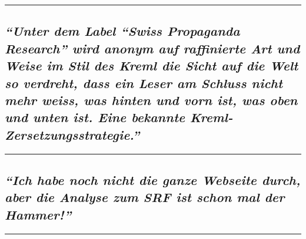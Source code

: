 \begin{center}\rule{0.5\linewidth}{\linethickness}\end{center}

\hypertarget{unter-dem-label-swiss-propaganda-research-wird-anonym-auf-raffinierte-art-und-weise-im-stil-des-kreml-die-sicht-auf-die-welt-so-verdreht-dass-ein-leser-am-schluss-nicht-mehr-weiss-was-hinten-und-vorn-ist-was-oben-und-unten-ist-eine-bekannte-kreml-zersetzungsstrategie}{%
\subsection{\texorpdfstring{\emph{``Unter dem Label ``Swiss Propaganda
Research'' wird anonym auf raffinierte Art und Weise im Stil des Kreml
die Sicht auf die Welt so verdreht, dass ein Leser am Schluss nicht mehr
weiss, was hinten und vorn ist, was oben und unten ist. Eine bekannte
Kreml-Zersetzungs­strategie.''}}{``Unter dem Label ``Swiss Propaganda Research'' wird anonym auf raffinierte Art und Weise im Stil des Kreml die Sicht auf die Welt so verdreht, dass ein Leser am Schluss nicht mehr weiss, was hinten und vorn ist, was oben und unten ist. Eine bekannte Kreml-Zersetzungs­strategie.''}}\label{unter-dem-label-swiss-propaganda-research-wird-anonym-auf-raffinierte-art-und-weise-im-stil-des-kreml-die-sicht-auf-die-welt-so-verdreht-dass-ein-leser-am-schluss-nicht-mehr-weiss-was-hinten-und-vorn-ist-was-oben-und-unten-ist-eine-bekannte-kreml-zersetzungsstrategie}}

\begin{center}\rule{0.5\linewidth}{\linethickness}\end{center}

\hypertarget{ich-habe-noch-nicht-die-ganze-webseite-durch-aber-die-analyse-zum-srf-ist-schon-mal-der-hammer}{%
\subsection{\texorpdfstring{\emph{``Ich habe noch nicht die ganze
Webseite durch, aber die Analyse zum SRF ist schon mal der
Hammer!''}}{``Ich habe noch nicht die ganze Webseite durch, aber die Analyse zum SRF ist schon mal der Hammer!''}}\label{ich-habe-noch-nicht-die-ganze-webseite-durch-aber-die-analyse-zum-srf-ist-schon-mal-der-hammer}}

\begin{center}\rule{0.5\linewidth}{\linethickness}\end{center}

